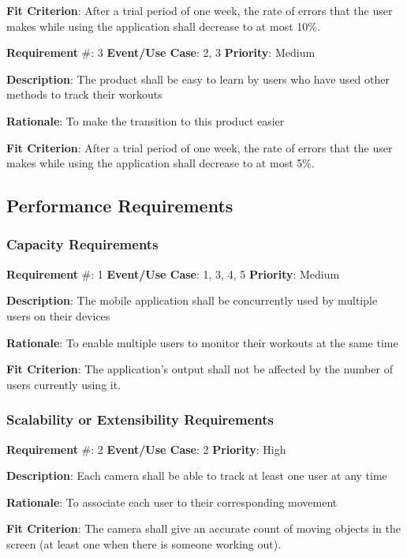 \documentclass{article}
\newcommand\tab{\hspace*{2cm}}
\begin{document}
\textbf{Fit Criterion}: After a trial period of one week, the rate of errors that the user makes while using the application shall decrease to at most 10\%.

\medskip

\textbf{Requirement} \#: 3 \tab \textbf{Event/Use Case}: 2, 3 \tab \textbf{Priority}: Medium

\textbf{Description}: The product shall be easy to learn by users who have used other methods to track their workouts

\textbf{Rationale}: To make the transition to this product easier

\textbf{Fit Criterion}: After a trial period of one week, the rate of errors that the user makes while using the application shall decrease to at most 5\%.

\medskip

\subsection{Performance Requirements}

\subsubsection{Capacity Requirements}

\textbf{Requirement} \#: 1 \tab \textbf{Event/Use Case}: 1, 3, 4, 5 \tab \textbf{Priority}: Medium

\textbf{Description}: The mobile application shall be concurrently used by multiple users on their devices

\textbf{Rationale}: To enable multiple users to monitor their workouts at the same time

\textbf{Fit Criterion}: The application's output shall not be affected by the number of users currently using it.

\medskip

\subsubsection{Scalability or Extensibility Requirements}
\textbf{Requirement} \#: 2 \tab \textbf{Event/Use Case}: 2 \tab \textbf{Priority}: High

\textbf{Description}: Each camera shall be able to track at least one user at any time

\textbf{Rationale}: To associate each user to their corresponding movement

\textbf{Fit Criterion}: The camera shall give an accurate count of moving objects in the screen (at least one when there is someone working out).
\end{document}
